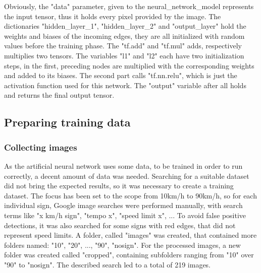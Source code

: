 Obviously, the "data" parameter, given to the neural\_network\_model represents the input tensor, thus it holds every pixel provided by the image. The dictionaries "hidden\_layer\_1", "hidden\_layer\_2" and "output\_layer" hold the weights and biases of the incoming edges, they are all initialized with random values before the training phase. The "tf.add" and "tf.mul" adds, respectively multiplies two tensors. The variables "l1" and "l2" each have two initialization steps, in the first, preceding nodes are multiplied with the corresponding weights and added to its biases. The second part calls "tf.nn.relu", which is just the activation function used for this network. The "output" variable after all holds and returns the final output tensor. 

\subsection{Preparing training data}
\subsubsection{Collecting images}
As the artificial neural network uses some data, to be trained in order to run correctly, a decent amount of data was needed. Searching for a suitable dataset did not bring the expected results, so it was necessary to create a training dataset. The focus has been set to the scope from 10km/h to 90km/h, so for each individual sign, Google image searches were performed manually, with search terms like "x km/h sign", "tempo x", "speed limit x", ...  To avoid false positive detections, it was also searched for some signs with red edges, that did not represent speed limits. A folder, called "images" was created, that contained more folders named: "10", "20", ..., "90", "nosign". For the processed images, a new folder was created called "cropped", containing subfolders ranging from "10" over "90" to "nosign". The described search led to a total of 219 images. 


